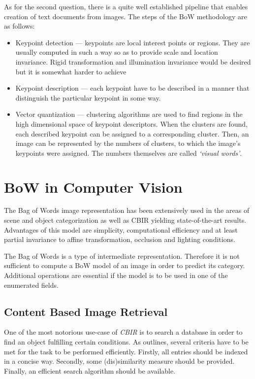 \documentclass[a4paper,12pt]{article}
\begin{document}
  As for the second question, there is a quite well established pipeline that enables creation of text documents from images. The steps of the BoW methodology are as follows:
  \begin{itemize}
   \item Keypoint detection --- keypoints are local interest points or regions. They are usually computed in such a way so as to provide scale and location invariance. Rigid transformation and illumination invariance would be desired but it is somewhat harder to achieve
   \item Keypoint description --- each keypoint have to be described in a manner that distinguish the particular keypoint in some way.
   \item Vector quantization --- clustering algorithms are used to find regions in the high dimensional space of keypoint descriptors. When the clusters are found, each described keypoint can be assigned to a corresponding cluster. Then, an image can be represented by the numbers of clusters, to which the image's keypoints were assigned. The numbers themselves are called \emph{`visual words'}.
  \end{itemize}
  
\section{BoW in Computer Vision}

  The Bag of Words image representation has been extensively used in the areas of scene \cite{csurka2004visual,fei2005bayesian, tsai2012bag} and object categorization \cite{zhangcategory} as well as CBIR \cite{li2010investigating,toldo2009bag} yielding state-of-the-art results. Advantages of this model are simplicity, computational efficiency and at least partial invariance to affine transformation, occlusion and lighting conditions. 
  
  The Bag of Words is a type of intermediate representation. Therefore it is not sufficient to compute a BoW model of an image in order to predict its category. Additional operations are essential if the model is to be used in one of the enumerated fields.
  
  \subsection{Content Based Image Retrieval}
  
  One of the most notorious use-case of \emph{CBIR} is to search a database in order to find an object fulfilling certain conditions. As \cite{toldo2009bag} outlines, several criteria have to be met for the task to be performed efficiently. Firstly, all entries should be indexed in a concise way. Secondly, some (dis)similarity measure should be provided. Finally, an efficient search algorithm should be available.  
    
\end{document}
